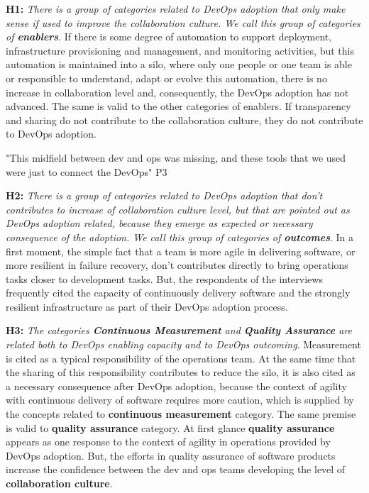 \textbf{H1:} \textit{There is a group of categories related to DevOps adoption that only make sense if used to improve the collaboration culture. We call this group of categories of \textbf{enablers}}. If there is some degree of automation to support deployment, infrastructure provisioning and management, and monitoring activities, but this automation is maintained into a silo, where only one people or one team is able or responsible to understand, adapt or evolve this automation, there is no increase in collaboration level and, consequently, the DevOps adoption has not advanced. The same is valid to the other categories of enablers. If transparency and sharing do not contribute to the collaboration culture, they do not contribute to DevOps adoption.

"This midfield between dev and ops was missing, and these tools that we used were just to connect the DevOps" P3

\textbf{H2:} \textit{There is a group of categories related to DevOps adoption that don't contributes to increase of collaboration culture level, but that are pointed out as DevOps adoption related, because they emerge as expected or necessary consequence of the adoption. We call this group of categories of \textbf{outcomes}}. In a first moment, the simple fact that a team is more agile in delivering software, or more resilient in failure recovery, don't contributes directly to bring operations tasks closer to development tasks. But, the respondents of the interviews frequently cited the capacity of continuously delivery software and the strongly resilient infrastructure as part of their DevOps adoption process.

\textbf{H3:} \textit{The categories \textbf{Continuous Measurement} and \textbf{Quality Assurance} are related both to DevOps enabling capacity and to DevOps outcoming}. Measurement is cited as a typical responsibility of the operations team. At the same time that the sharing of this responsibility contributes to reduce the silo, it is also cited as a necessary consequence after DevOps adoption, because the context of agility with continuous delivery of software requires more caution, which is supplied by the concepts related to \textbf{continuous measurement} category. The same premise is valid to \textbf{quality assurance} category. At first glance \textbf{quality assurance} appears as one response to the context of agility in operations provided by DevOps adoption. But, the efforts in quality assurance of software products increase the confidence between the dev and ops teams developing the level of \textbf{collaboration culture}.

